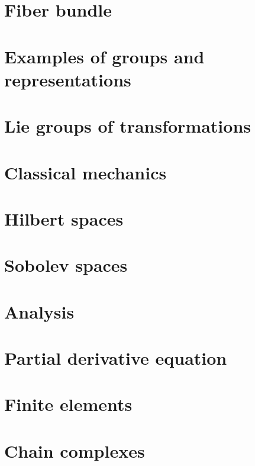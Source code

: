 \documentclass[a4paper,twoside,11pt]{book}
\begin{document}
\chapter{Fiber bundle}



\chapter{Examples of groups and representations}        \label{ChapThoComsGroupes}





\chapter{Lie groups of transformations}


\chapter{Classical mechanics}


\chapter{Hilbert spaces}



\chapter{Sobolev spaces}


\chapter{Analysis}




\chapter{Partial derivative equation}


\chapter{Finite elements}


\chapter{Chain complexes}

\end{document}
